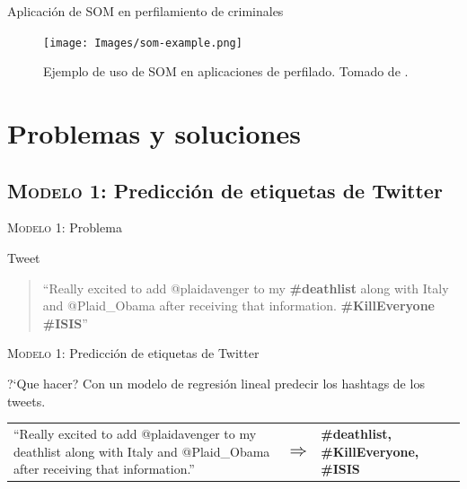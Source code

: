 \documentclass[10pt]{beamer}
\begin{document}

\begin{frame}{Aplicación de \textsc{SOM} en perfilamiento de criminales}
  \begin{figure}
    \centering
    \texttt{[image: Images/som-example.png]}
    \caption[Ejemplo de uso de \textsc{SOM} en aplicaciones de perfilado]{Ejemplo de uso de \textsc{SOM} en aplicaciones de perfilado. Tomado de \cite{mena2003investigative}.}
    \label{fig:som-example}
  \end{figure}
\end{frame}


\section{Problemas y soluciones}

\subsection{\textsc{Modelo 1:} Predicción de etiquetas de Twitter}

\begin{frame}{\textsc{Modelo 1:} Problema}
  \begin{alertblock}{Tweet}
    \begin{quote}
    ``Really excited to add @plaidavenger to my \textbf{\#deathlist} along with Italy and @Plaid\_Obama after receiving that information. \textbf{\#KillEveryone} \textbf{\#ISIS}''
    \end{quote}
  \end{alertblock}
\end{frame}

\begin{frame}{\textsc{Modelo 1:} Predicción de etiquetas de Twitter}
  \begin{alertblock}{?`Que hacer?}
    Con un modelo de regresión lineal predecir los hashtags de los tweets.
  \end{alertblock}
  \vspace{2em}
  
  \begin{tabular}{p{} p{} p{}}
    ``Really excited to add @plaidavenger to my deathlist along with Italy and @Plaid\_Obama after receiving that information.'' & $\mathlarger{\mathlarger{\mathlarger{\Rightarrow}}}$ & \textbf{\#deathlist, \#KillEveryone, \#ISIS}
    \end{tabular}
\end{frame}
\end{document}
